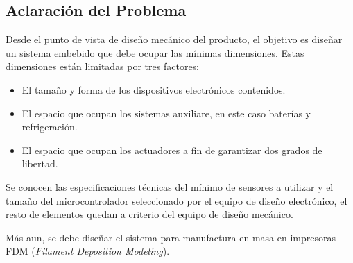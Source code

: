 \needspace{3cm}
\subsection{Aclaración del Problema}
Desde el punto de vista de diseño mecánico del producto, el objetivo es diseñar un sistema embebido que debe ocupar las mínimas dimensiones. Estas dimensiones están limitadas por tres factores:

\begin{itemize}
    \item El tamaño y forma de los dispositivos electrónicos contenidos.
    \item El espacio que ocupan los sistemas auxiliare, en este caso baterías y refrigeración.
    \item El espacio que ocupan los actuadores a fin de garantizar dos grados de libertad.
\end{itemize}

Se conocen las especificaciones técnicas del mínimo de sensores a utilizar y el tamaño del microcontrolador seleccionado por el equipo de diseño electrónico, el resto de elementos quedan a criterio del equipo de diseño mecánico.

Más aun, se debe diseñar el sistema para manufactura en masa en impresoras FDM (\textit{Filament Deposition Modeling}).

